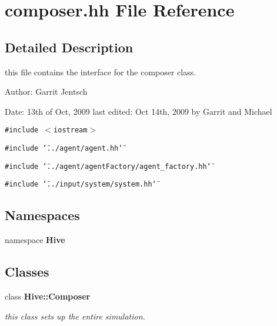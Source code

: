 \section{composer.hh File Reference}
\label{composer_8hh}


\subsection{Detailed Description}
this file contains the interface for the composer class.

\begin{Desc}
\item[Author:]Garrit Jentsch\end{Desc}
\begin{Desc}
\item[Date:]13th of Oct, 2009 last edited: Oct 14th, 2009 by Garrit and Michael \end{Desc}


{\tt \#include $<$iostream$>$}\par
{\tt \#include \char`\"{}../agent/agent.hh\char`\"{}}\par
{\tt \#include \char`\"{}../agent/agentFactory/agent\_\-factory.hh\char`\"{}}\par
{\tt \#include \char`\"{}../input/system/system.hh\char`\"{}}\par
\subsection*{Namespaces}
\begin{CompactItemize}
\item 
namespace {\bf Hive}
\end{CompactItemize}
\subsection*{Classes}
\begin{CompactItemize}
\item 
class {\bf Hive::Composer}
\begin{CompactList}\small\item\em this class sets up the entire simulation. \item\end{CompactList}\end{CompactItemize}

